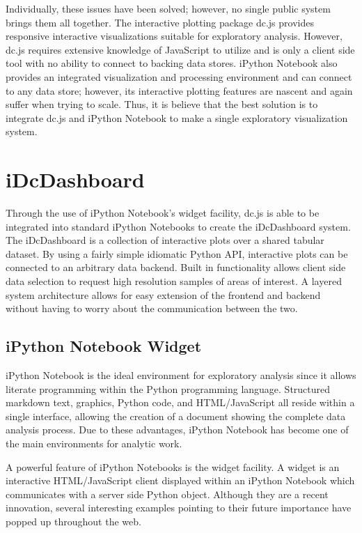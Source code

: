 \documentclass[letter,twocolumn]{article}
\begin{document}
Individually, these issues have been solved; however, no single public system brings them all together.
The interactive plotting package dc.js\cite{dcjs} provides responsive interactive visualizations suitable for exploratory analysis.
However, dc.js requires extensive knowledge of JavaScript to utilize and is only a client side tool with no ability to connect to backing data stores.
iPython Notebook also provides an integrated visualization and processing environment and can connect to any data store; however, its interactive plotting features are nascent and again suffer when trying to scale.
Thus, it is believe that the best solution is to integrate dc.js and iPython Notebook to make a single exploratory visualization system.

\section{iDcDashboard}%

Through the use of iPython Notebook's widget facility, dc.js is able to be integrated into standard iPython Notebooks to create the iDcDashboard system.
The iDcDashboard is a collection of interactive plots over a shared tabular dataset.
By using a fairly simple idiomatic Python API, interactive plots can be connected to an arbitrary data backend.
Built in functionality allows client side data selection to request high resolution samples of areas of interest.
A layered system architecture allows for easy extension of the frontend and backend without having to worry about the communication between the two.

\subsection{iPython Notebook Widget}

iPython Notebook\cite{perez2013open} is the ideal environment for exploratory analysis since it allows literate programming within the Python programming language.
Structured markdown text, graphics, Python code, and HTML/JavaScript all reside within a single interface, allowing the creation of a document showing the complete data analysis process. 
Due to these advantages, iPython Notebook has become one of the main environments for analytic work.

A powerful feature of iPython Notebooks is the widget facility.
A widget is an interactive HTML/JavaScript client displayed within an iPython Notebook which communicates with a server side Python object.
Although they are a recent innovation, several interesting examples pointing to their future importance have popped up throughout the web\cite{widget}.
\end{document}
